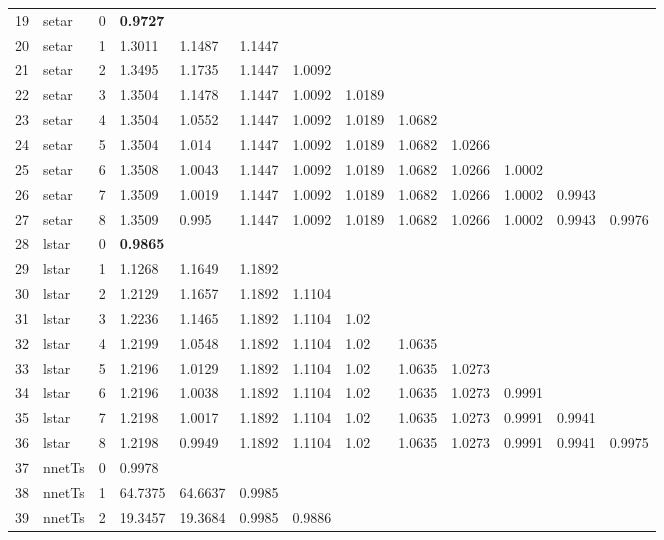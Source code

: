 \documentclass[10pt,a4paper]{article}
\begin{document}
\begin{table}[ht]
\begin{tabular}{rlrllllllllll}
   \hline
19 & setar &     0 & \textbf{0.9727} &  &  &  &  &  &  &  &  &  \\ 
  20 & setar &     1 & 1.3011 & 1.1487 & 1.1447 &  &  &  &  &  &  &  \\ 
  21 & setar &     2 & 1.3495 & 1.1735 & 1.1447 & 1.0092 &  &  &  &  &  &  \\ 
  22 & setar &     3 & 1.3504 & 1.1478 & 1.1447 & 1.0092 & 1.0189 &  &  &  &  &  \\ 
  23 & setar &     4 & 1.3504 & 1.0552 & 1.1447 & 1.0092 & 1.0189 & 1.0682 &  &  &  &  \\ 
  24 & setar &     5 & 1.3504 & 1.014 & 1.1447 & 1.0092 & 1.0189 & 1.0682 & 1.0266 &  &  &  \\ 
  25 & setar &     6 & 1.3508 & 1.0043 & 1.1447 & 1.0092 & 1.0189 & 1.0682 & 1.0266 & 1.0002 &  &  \\ 
  26 & setar &     7 & 1.3509 & 1.0019 & 1.1447 & 1.0092 & 1.0189 & 1.0682 & 1.0266 & 1.0002 & 0.9943 &  \\ 
  27 & setar &     8 & 1.3509 & 0.995 & 1.1447 & 1.0092 & 1.0189 & 1.0682 & 1.0266 & 1.0002 & 0.9943 & 0.9976 \\ 
   \hline
28 & lstar &     0 & \textbf{0.9865} &  &  &  &  &  &  &  &  &  \\ 
  29 & lstar &     1 & 1.1268 & 1.1649 & 1.1892 &  &  &  &  &  &  &  \\ 
  30 & lstar &     2 & 1.2129 & 1.1657 & 1.1892 & 1.1104 &  &  &  &  &  &  \\ 
  31 & lstar &     3 & 1.2236 & 1.1465 & 1.1892 & 1.1104 & 1.02 &  &  &  &  &  \\ 
  32 & lstar &     4 & 1.2199 & 1.0548 & 1.1892 & 1.1104 & 1.02 & 1.0635 &  &  &  &  \\ 
  33 & lstar &     5 & 1.2196 & 1.0129 & 1.1892 & 1.1104 & 1.02 & 1.0635 & 1.0273 &  &  &  \\ 
  34 & lstar &     6 & 1.2196 & 1.0038 & 1.1892 & 1.1104 & 1.02 & 1.0635 & 1.0273 & 0.9991 &  &  \\ 
  35 & lstar &     7 & 1.2198 & 1.0017 & 1.1892 & 1.1104 & 1.02 & 1.0635 & 1.0273 & 0.9991 & 0.9941 &  \\ 
  36 & lstar &     8 & 1.2198 & 0.9949 & 1.1892 & 1.1104 & 1.02 & 1.0635 & 1.0273 & 0.9991 & 0.9941 & 0.9975 \\ 
   \hline
37 & nnetTs &     0 & 0.9978 &  &  &  &  &  &  &  &  &  \\ 
  38 & nnetTs &     1 & 64.7375 & 64.6637 & 0.9985 &  &  &  &  &  &  &  \\ 
  39 & nnetTs &     2 & 19.3457 & 19.3684 & 0.9985 & 0.9886 &  &  &  &  &  &  \\ 

\end{tabular}
\end{table}
\end{document}
